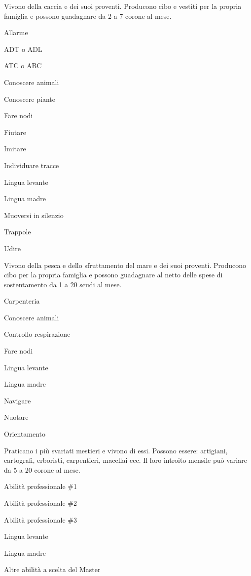 
Vivono della caccia e dei suoi proventi. Producono cibo e vestiti per
la propria famiglia e possono guadagnare da 2 a 7 corone al mese.

\begin{abilist}
\item Allarme
\item ADT o ADL
\item ATC o ABC
\item Conoscere animali
\item Conoscere piante
\item Fare nodi
\item Fiutare
\item Imitare
\item Individuare tracce
\item Lingua levante
\item Lingua madre
\item Muoversi in silenzio
\item Trappole
\item Udire
\end{abilist}


Vivono della pesca e dello sfruttamento del mare e dei suoi proventi.
Producono cibo per la propria famiglia e possono guadagnare al netto
delle spese di sostentamento da 1 a 20 scudi al mese.

\begin{abilist}
\item Carpenteria
\item Conoscere animali
\item Controllo respirazione
\item Fare nodi
\item Lingua levante
\item Lingua madre
\item Navigare
\item Nuotare
\item Orientamento
\end{abilist}


Praticano i pi\`u svariati mestieri e vivono di essi. Possono
essere: artigiani, cartografi, erboristi, carpentieri, macellai ecc.
Il loro introito mensile pu\`o variare da 5 a 20 corone al mese.

\begin{abilist}
\item Abilit\`a professionale \#1
\item Abilit\`a professionale \#2
\item Abilit\`a professionale \#3
\item Lingua levante
\item Lingua madre
\item Altre abilit\`a a scelta del Master
\end{abilist}
 
